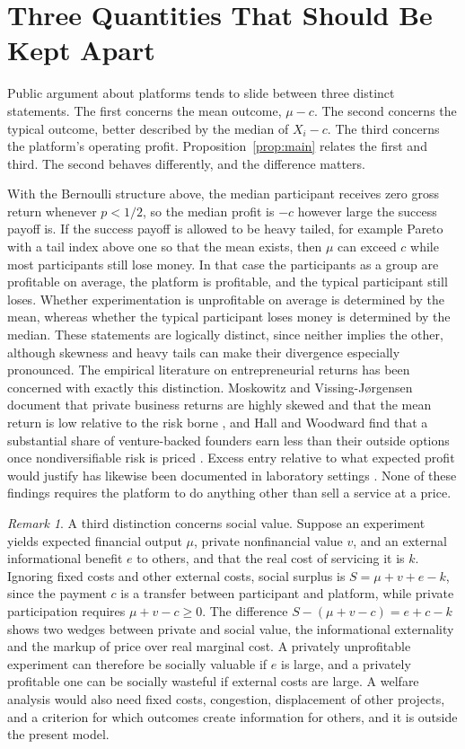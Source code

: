 \documentclass[11pt]{article}
\theoremstyle{remark}
\newtheorem{remark}{Remark}
\begin{document}
\section{Three Quantities That Should Be Kept Apart}\label{sec:three}

Public argument about platforms tends to slide between three distinct statements. The first concerns the mean outcome, $\mu - c$. The second concerns the typical outcome, better described by the median of $X_i - c$. The third concerns the platform's operating profit. Proposition~\ref{prop:main} relates the first and third. The second behaves differently, and the difference matters.

With the Bernoulli structure above, the median participant receives zero gross return whenever $p<1/2$, so the median profit is $-c$ however large the success payoff is. If the success payoff is allowed to be heavy tailed, for example Pareto with a tail index above one so that the mean exists, then $\mu$ can exceed $c$ while most participants still lose money. In that case the participants as a group are profitable on average, the platform is profitable, and the typical participant still loses. Whether experimentation is unprofitable on average is determined by the mean, whereas whether the typical participant loses money is determined by the median. These statements are logically distinct, since neither implies the other, although skewness and heavy tails can make their divergence especially pronounced. The empirical literature on entrepreneurial returns has been concerned with exactly this distinction. Moskowitz and Vissing-J{\o}rgensen document that private business returns are highly skewed and that the mean return is low relative to the risk borne \cite{moskowitz2002}, and Hall and Woodward find that a substantial share of venture-backed founders earn less than their outside options once nondiversifiable risk is priced \cite{hall2010}. Excess entry relative to what expected profit would justify has likewise been documented in laboratory settings \cite{camerer1999}. None of these findings requires the platform to do anything other than sell a service at a price.

\begin{remark}\label{rem:social}
A third distinction concerns social value. Suppose an experiment yields expected financial output $\mu$, private nonfinancial value $v$, and an external informational benefit $e$ to others, and that the real cost of servicing it is $k$. Ignoring fixed costs and other external costs, social surplus is $S=\mu+v+e-k$, since the payment $c$ is a transfer between participant and platform, while private participation requires $\mu+v-c\ge 0$. The difference $S-(\mu+v-c)=e+c-k$ shows two wedges between private and social value, the informational externality and the markup of price over real marginal cost. A privately unprofitable experiment can therefore be socially valuable if $e$ is large, and a privately profitable one can be socially wasteful if external costs are large. A welfare analysis would also need fixed costs, congestion, displacement of other projects, and a criterion for which outcomes create information for others, and it is outside the present model.
\end{remark}
\end{document}
